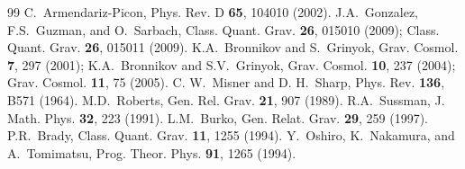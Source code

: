 \documentclass[aps,prd,twocolumn,eqsecnum,showpacs,amsmath]{revtex4}
\begin{document}
\begin{thebibliography}{99}
C.~Armendariz-Picon,
Phys. Rev. D {\bf 65}, 104010 (2002).
J.A.~Gonzalez, F.S.~Guzman, and O.~Sarbach,
Class. Quant. Grav. {\bf 26}, 015010 (2009);
Class. Quant. Grav. {\bf 26}, 015011 (2009).
K.A.~Bronnikov and S.~Grinyok,
Grav. Cosmol. {\bf 7}, 297 (2001);
K.A.~Bronnikov and S.V.~Grinyok,
Grav. Cosmol. {\bf 10}, 237 (2004);
Grav. Cosmol. {\bf 11}, 75 (2005).
C. W.~Misner and D. H.~Sharp, 
Phys. Rev. {\bf 136}, B571 (1964).
M.D.~Roberts, 
  Gen. Rel. Grav.
  {\bf 21}, 907 (1989). 
R.A.~Sussman, 
J. Math. Phys. {\bf 32}, 223 (1991). 
L.M.~Burko, 
Gen. Relat. Grav. {\bf 29}, 259 (1997). 
P.R.~Brady,
Class. Quant. Grav. {\bf 11}, 1255 (1994). 
Y.~Oshiro, K.~Nakamura, and A.~Tomimatsu, 
Prog. Theor. Phys. {\bf 91}, 1265 (1994). 

\end{thebibliography}
\end{document}

